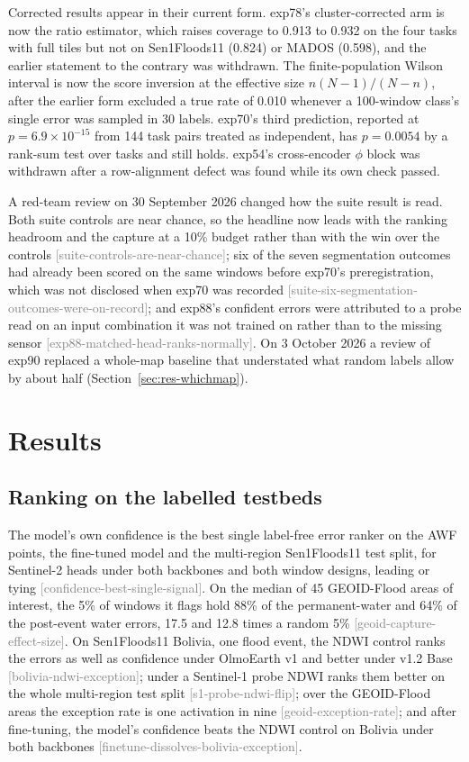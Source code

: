 \documentclass[11pt,a4paper]{article}
\newcommand{\claim}[1]{{\scriptsize\textsf{\textcolor{gray}{[#1]}}}}
\begin{document}
Corrected results appear in their current form. exp78's cluster-corrected arm is now the ratio estimator, which
raises coverage to 0.913 to 0.932 on the four tasks with full tiles but not on Sen1Floods11 (0.824) or MADOS (0.598),
and the earlier statement to the contrary was withdrawn. The finite-population Wilson interval is now the score inversion at the effective size $n(N-1)/(N-n)$, after
the earlier form excluded a true rate of 0.010 whenever a 100-window class's single error was sampled in 30 labels.
exp70's third prediction, reported at $p = 6.9\times10^{-15}$ from 144 task pairs treated as independent, has
$p = 0.0054$ by a rank-sum test over tasks and still holds. exp54's cross-encoder $\phi$ block was withdrawn after a
row-alignment defect was found while its own check passed.

A red-team review on 30 September 2026 changed how the suite result is read. Both suite controls are near chance, so
the headline now leads with the ranking headroom and the capture at a 10\% budget rather than with the win over the
controls \claim{suite-controls-are-near-chance}; six of the seven segmentation outcomes had already been scored on the
same windows before exp70's preregistration, which was not disclosed when exp70 was recorded
\claim{suite-six-segmentation-outcomes-were-on-record}; and exp88's confident errors were attributed to a probe read on
an input combination it was not trained on rather than to the missing sensor \claim{exp88-matched-head-ranks-normally}.
On 3 October 2026 a review of exp90 replaced a whole-map baseline that understated what random labels allow by about
half (Section~\ref{sec:res-whichmap}).

\section{Results}
\label{sec:results}

\subsection{Ranking on the labelled testbeds}

The model's own confidence is the best single label-free error ranker on the AWF points, the fine-tuned model and the
multi-region Sen1Floods11 test split, for Sentinel-2 heads under both backbones and both window designs, leading or
tying \claim{confidence-best-single-signal}. On the median of 45 GEOID-Flood areas of interest, the 5\% of windows it flags
hold 88\% of the permanent-water and 64\% of the post-event water errors, 17.5 and 12.8 times a random 5\%
\claim{geoid-capture-effect-size}. On Sen1Floods11 Bolivia, one flood event, the NDWI control ranks the errors as well
as confidence under OlmoEarth v1 and better under v1.2 Base \claim{bolivia-ndwi-exception}; under a Sentinel-1 probe
NDWI ranks them better on the whole multi-region test split \claim{s1-probe-ndwi-flip}; over the GEOID-Flood areas the
exception rate is one activation in nine \claim{geoid-exception-rate}; and after fine-tuning, the model's confidence
beats the NDWI control on Bolivia under both backbones \claim{finetune-dissolves-bolivia-exception}.
\end{document}
